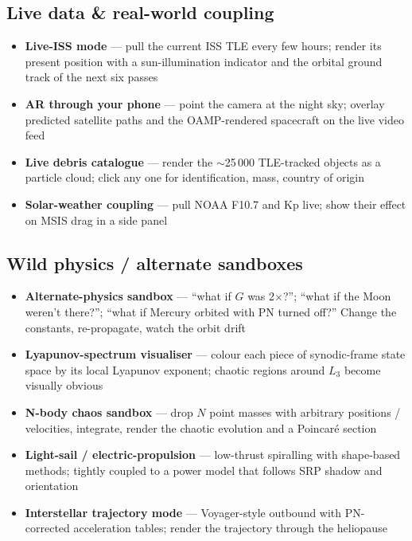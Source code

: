 \documentclass[11pt, a4paper]{article}
\begin{document}
\subsection{Live data \& real-world coupling}

\begin{itemize}[leftmargin=*]
  \item \textbf{Live-ISS mode} --- pull the current ISS TLE every few
        hours; render its present position with a sun-illumination
        indicator and the orbital ground track of the next six passes
  \item \textbf{AR through your phone} --- point the camera at the night
        sky; overlay predicted satellite paths and the OAMP-rendered
        spacecraft on the live video feed
  \item \textbf{Live debris catalogue} --- render the $\sim$25\,000
        TLE-tracked objects as a particle cloud; click any one for
        identification, mass, country of origin
  \item \textbf{Solar-weather coupling} --- pull NOAA F10.7 and Kp live;
        show their effect on MSIS drag in a side panel
\end{itemize}

\subsection{Wild physics / alternate sandboxes}

\begin{itemize}[leftmargin=*]
  \item \textbf{Alternate-physics sandbox} --- ``what if $G$ was 2$\times$?'';
        ``what if the Moon weren't there?''; ``what if Mercury orbited
        with PN turned off?'' Change the constants, re-propagate, watch
        the orbit drift
  \item \textbf{Lyapunov-spectrum visualiser} --- colour each piece of
        synodic-frame state space by its local Lyapunov exponent;
        chaotic regions around $L_3$ become visually obvious
  \item \textbf{N-body chaos sandbox} --- drop $N$ point masses with
        arbitrary positions / velocities, integrate, render the chaotic
        evolution and a Poincar\'e section
  \item \textbf{Light-sail / electric-propulsion} --- low-thrust
        spiralling with shape-based methods; tightly coupled to a power
        model that follows SRP shadow and orientation
  \item \textbf{Interstellar trajectory mode} --- Voyager-style outbound
        with PN-corrected acceleration tables; render the trajectory
        through the heliopause
\end{itemize}
\end{document}
